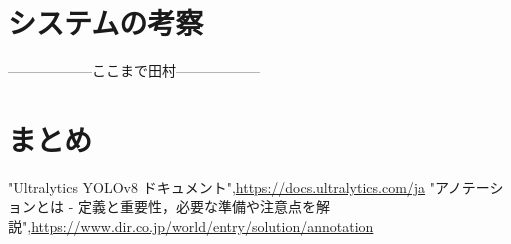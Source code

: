 \begin{multicols*}{2}
\section{システムの考察}


------------------ここまで田村------------------\\

\section{まとめ}



\begin{thebibliography}{99}
"Ultralytics YOLOv8 ドキュメント",\url{https://docs.ultralytics.com/ja}
"アノテーションとは - 定義と重要性，必要な準備や注意点を解説",\url{https://www.dir.co.jp/world/entry/solution/annotation}
\end{thebibliography}


\end{multicols*} 



